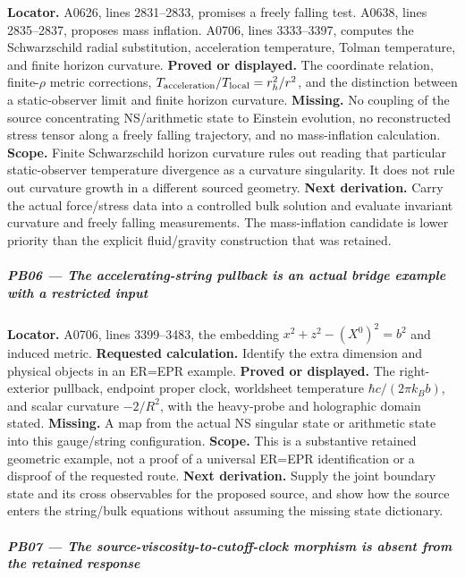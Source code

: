 \textbf{Locator.} A0626, lines 2831--2833, promises a freely falling
test. A0638, lines 2835--2837, proposes mass inflation. A0706, lines
3333--3397, computes the Schwarzschild radial substitution, acceleration
temperature, Tolman temperature, and finite horizon curvature.
\textbf{Proved or displayed.} The coordinate relation, finite-\(\rho\)
metric corrections, \(T_{\rm acceleration}/T_{\rm local}=r_h^2/r^2\),
and the distinction between a static-observer limit and finite horizon
curvature. \textbf{Missing.} No coupling of the source concentrating
NS/arithmetic state to Einstein evolution, no reconstructed stress
tensor along a freely falling trajectory, and no mass-inflation
calculation. \textbf{Scope.} Finite Schwarzschild horizon curvature
rules out reading that particular static-observer temperature divergence
as a curvature singularity. It does not rule out curvature growth in a
different sourced geometry. \textbf{Next derivation.} Carry the actual
force/stress data into a controlled bulk solution and evaluate invariant
curvature and freely falling measurements. The mass-inflation candidate
is lower priority than the explicit fluid/gravity construction that was
retained.

\subparagraph{PB06 --- The accelerating-string pullback is an actual
bridge example with a restricted
input}\label{pb06-the-accelerating-string-pullback-is-an-actual-bridge-example-with-a-restricted-input}

\textbf{Locator.} A0706, lines 3399--3483, the embedding
\(x^2+z^2-(X^0)^2=b^2\) and induced metric. \textbf{Requested
calculation.} Identify the extra dimension and physical objects in an
ER=EPR example. \textbf{Proved or displayed.} The right-exterior
pullback, endpoint proper clock, worldsheet temperature
\(\hbar c/(2\pi k_Bb)\), and scalar curvature \(-2/R^2\), with the
heavy-probe and holographic domain stated. \textbf{Missing.} A map from
the actual NS singular state or arithmetic state into this gauge/string
configuration. \textbf{Scope.} This is a substantive retained geometric
example, not a proof of a universal ER=EPR identification or a disproof
of the requested route. \textbf{Next derivation.} Supply the joint
boundary state and its cross observables for the proposed source, and
show how the source enters the string/bulk equations without assuming
the missing state dictionary.

\subparagraph{PB07 --- The source-viscosity-to-cutoff-clock morphism is
absent from the retained
response}\label{pb07-the-source-viscosity-to-cutoff-clock-morphism-is-absent-from-the-retained-response}

